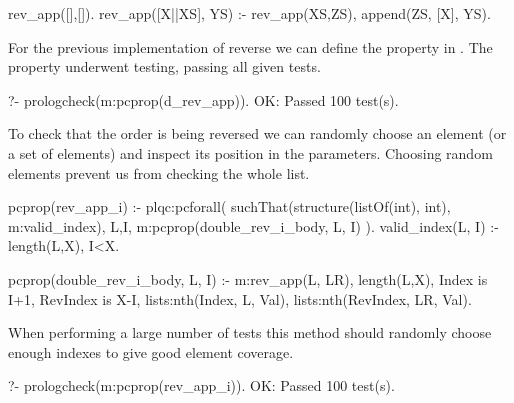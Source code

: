 \begin{yapcode}
 rev_app([],[]).
 rev_app([X||XS], YS) :- rev_app(XS,ZS), append(ZS, [X], YS).
\end{yapcode}


For the previous implementation of reverse we can define the 
property in .
%
The property underwent testing, passing all given tests.
%
\begin{yapcode}
   ?- prologcheck(m:pcprop(d_rev_app)).
 OK: Passed 100 test(s).
\end{yapcode}
%


To check that the order is being reversed we can randomly choose an
element (or a %
 set of elements) and inspect
 its position in the parameters.
%
Choosing random elements prevent us from checking the whole list.
%
\begin{yapcode}
 pcprop(rev_app_i) :- plqc:pcforall(
     suchThat(structure({listOf(int), int}), m:valid_index),
     {L,I}, m:pcprop({double_rev_i_body, L, I}) ).
 valid_index({L, I}) :- length(L,X), I<X.

 pcprop({double_rev_i_body, L, I}) :- 
   m:rev_app(L, LR), length(L,X), Index is I+1, RevIndex is X-I,
   lists:nth(Index, L, Val), lists:nth(RevIndex, LR, Val).
\end{yapcode}
%
When performing a large number of tests this method should
 randomly choose enough indexes to 
give good
element coverage.
%
\begin{yapcode}
   ?- prologcheck(m:pcprop(rev_app_i)).
 OK: Passed 100 test(s).
\end{yapcode}

